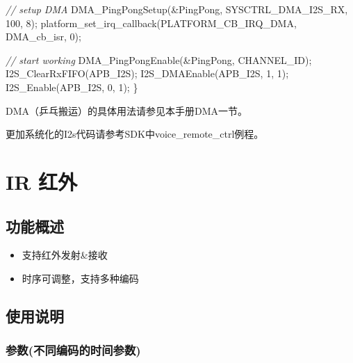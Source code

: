 \documentclass[
  12pt,
]{book}
\newenvironment{Shaded}{\begin{snugshade}}{\end{snugshade}}
\newcommand{\CommentTok}[1]{\textcolor[rgb]{0.56,0.35,0.01}{\textit{#1}}}
\newcommand{\DecValTok}[1]{\textcolor[rgb]{0.00,0.00,0.81}{#1}}
\newcommand{\NormalTok}[1]{#1}
\providecommand{\tightlist}{%
  \setlength{\itemsep}{0pt}\setlength{\parskip}{0pt}}
\begin{document}
\begin{Shaded}
\begin{Highlighting}[]
    \CommentTok{// setup DMA}
\NormalTok{    DMA_PingPongSetup(&PingPong, SYSCTRL_DMA_I2S_RX, }\DecValTok{100}\NormalTok{, }\DecValTok{8}\NormalTok{);}
\NormalTok{    platform_set_irq_callback(PLATFORM_CB_IRQ_DMA, DMA_cb_isr, }\DecValTok{0}\NormalTok{);}
    
    \CommentTok{// start working}
\NormalTok{    DMA_PingPongEnable(&PingPong, CHANNEL_ID);}
\NormalTok{    I2S_ClearRxFIFO(APB_I2S);}
\NormalTok{    I2S_DMAEnable(APB_I2S, }\DecValTok{1}\NormalTok{, }\DecValTok{1}\NormalTok{);    }
\NormalTok{    I2S_Enable(APB_I2S, }\DecValTok{0}\NormalTok{, }\DecValTok{1}\NormalTok{);}
\NormalTok{\}}
\end{Highlighting}
\end{Shaded}

DMA（乒乓搬运）的具体用法请参见本手册DMA一节。

更加系统化的I2s代码请参考SDK中voice\_remote\_ctrl例程。

\hypertarget{ir-ux7ea2ux5916}{%
\chapter{IR 红外}\label{ir-ux7ea2ux5916}}

\hypertarget{ux529fux80fdux6982ux8ff0-2}{%
\section{功能概述}\label{ux529fux80fdux6982ux8ff0-2}}

\begin{itemize}
\tightlist
\item
  支持红外发射\&接收
\item
  时序可调整，支持多种编码
\end{itemize}

\hypertarget{ux4f7fux7528ux8bf4ux660e-2}{%
\section{使用说明}\label{ux4f7fux7528ux8bf4ux660e-2}}

\hypertarget{ux53c2ux6570ux4e0dux540cux7f16ux7801ux7684ux65f6ux95f4ux53c2ux6570}{%
\subsection{参数(不同编码的时间参数)}\label{ux53c2ux6570ux4e0dux540cux7f16ux7801ux7684ux65f6ux95f4ux53c2ux6570}}
\end{document}
